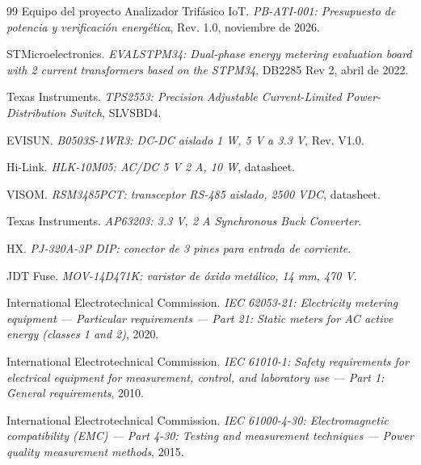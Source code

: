 \documentclass[11pt,a4paper]{article}
\begin{document}
\begin{thebibliography}{99}
Equipo del proyecto Analizador Trifásico IoT.
\textit{PB-ATI-001: Presupuesto de potencia y verificación energética},
Rev. 1.0, noviembre de 2026.

STMicroelectronics.
\textit{EVALSTPM34: Dual-phase energy metering evaluation board with 2 current
transformers based on the STPM34}, DB2285 Rev 2, abril de 2022.

Texas Instruments.
\textit{TPS2553: Precision Adjustable Current-Limited Power-Distribution Switch},
SLVSBD4.

EVISUN.
\textit{B0503S-1WR3: DC-DC aislado 1 W, 5 V a 3.3 V}, Rev. V1.0.

Hi-Link.
\textit{HLK-10M05: AC/DC 5 V 2 A, 10 W}, datasheet.

VISOM.
\textit{RSM3485PCT: transceptor RS-485 aislado, 2500 VDC}, datasheet.

Texas Instruments.
\textit{AP63203: 3.3 V, 2 A Synchronous Buck Converter}.

HX.
\textit{PJ-320A-3P DIP: conector de 3 pines para entrada de corriente}.

JDT Fuse.
\textit{MOV-14D471K: varistor de óxido metálico, 14 mm, 470 V}.

International Electrotechnical Commission.
\textit{IEC 62053-21: Electricity metering equipment --- Particular
requirements --- Part 21: Static meters for AC active energy (classes 1 and 2)},
2020.

International Electrotechnical Commission.
\textit{IEC 61010-1: Safety requirements for electrical equipment for
measurement, control, and laboratory use --- Part 1: General requirements},
2010.

International Electrotechnical Commission.
\textit{IEC 61000-4-30: Electromagnetic compatibility (EMC) --- Part 4-30:
Testing and measurement techniques --- Power quality measurement methods},
2015.

\end{thebibliography}

\vspace{0.5em}
\end{document}
